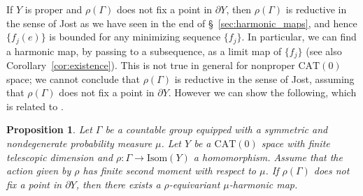 \documentclass[12pt]{amsart}
\numberwithin{equation}{section}
\theoremstyle{plain}
\newtheorem{Proposition}[Theorem]{Proposition}
\theoremstyle{definition}
\theoremstyle{remark}
\newcommand{\isom}[1]{\mathrm{Isom}({#1})}
\newcommand{\cat}[1]{\mathrm{CAT}(#1)}
\begin{document}
%
% 
 If $Y$ is proper and $\rho(\Gamma)$ does not fix a point in 
 $\partial Y$, then 
 $\rho(\Gamma)$ is reductive in the sense of Jost as we have seen 
 in the end of \S~\ref{sec:harmonic_maps},
 and hence $\{f_j(e)\}$ is bounded for any minimizing sequence $\{f_j\}$.  
 In particular, we can find a harmonic map, by passing to a subsequence,
 as a limit map of $\{f_j\}$ (see also Corollary~\ref{cor:existence}). 
 This is not true in general for nonproper $\cat{0}$ space; we cannot
 conclude that $\rho(\Gamma)$ is 
 reductive in the sense of Jost,  
 assuming that $\rho(\Gamma)$ does not fix a point in $\partial Y$. 
 However we can show the following, which is related to 
 \cite[Lemma A.7]{caprace1-2}.

\begin{Proposition}
 \label{thm:existence_finite_teledim}
 Let $\Gamma$ be a countable group equipped with a symmetric
 and nondegenerate probability measure $\mu$.
 Let $Y$ be a $\cat{0}$ space with finite telescopic dimension
 and $\rho \colon \Gamma \rightarrow \isom{Y}$ a homomorphism. 
 Assume that the action given by $\rho$ has finite second
 moment with respect to $\mu$.
 If $\rho(\Gamma)$ does not fix a point in $\partial Y$, then there
 exists a $\rho$-equivariant $\mu$-harmonic map. 
\end{Proposition}
\end{document}
